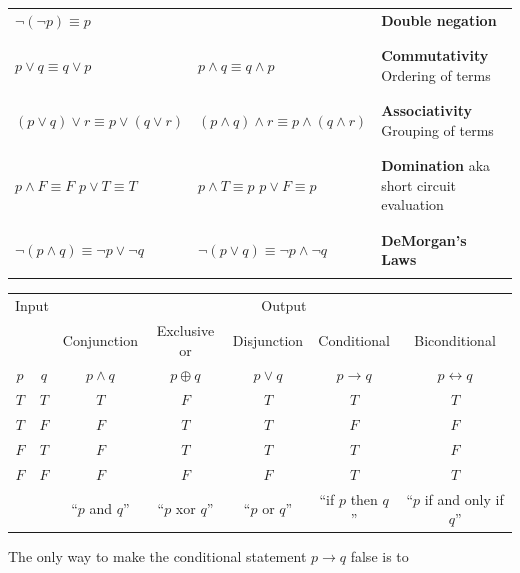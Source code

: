 \documentclass[12pt, oneside]{article}
\begin{document}
\begin{tabular}{llp{3in}}
$\lnot ( \lnot p) \equiv p$ & & {\bf Double negation}\\
&& \\
&& \\
$p \lor q \equiv q \lor p$ & $p \land q \equiv q \land p$ & {\bf Commutativity} Ordering of terms\\
&& \\
&& \\
$(p \lor q) \lor r  \equiv p \lor (q \lor r)$ & $(p \land q) \land r  \equiv p \land (q \land r)$ & {\bf Associativity} Grouping of terms\\
&& \\
&& \\
$p \land F \equiv F$ \qquad $p \lor T \equiv T$ & $p \land T \equiv p$ \qquad $p \lor F \equiv p$ & {\bf Domination} aka 
short circuit evaluation\\
&& \\
&& \\
$\lnot (p \land q) \equiv \lnot p \lor \lnot q$ & $\lnot (p \lor q) \equiv \lnot p \land\lnot q$  & {\bf DeMorgan's Laws}\\
&& \\
\end{tabular}
 \newpage


\begin{center}
    \begin{tabular}{cc||c|c|c|c|c}
    \multicolumn{2}{c||}{Input}  & \multicolumn{5}{c}{Output} \\
     & & Conjunction &  Exclusive or & Disjunction  &  Conditional & Biconditional  \\
    $p$ & $q$ & $p \wedge q$ &  $p  \oplus  q$ & $p \vee  q$ & $p \to q$ & $p \leftrightarrow q$\\
    \hline
    $T$ & $T$ & $T$ & $F$ & $T$ & $T$& $T$\\
    $T$ & $F$ & $F$ & $T$ & $T$ & $F$& $F$\\
    $F$ & $T$ & $F$ & $T$ & $T$ & $T$& $F$\\
    $F$ & $F$ & $F$ & $F$ & $F$ & $T$& $T$\\
    \hline
    && ``$p$ and $q$'' & ``$p$ xor $q$'' & ``$p$ or $q$'' & ``if $p$ then $q$'' & ``$p$ if and only if $q$''
    \end{tabular}
\end{center}
     

The only way to make  the conditional statement $p \to q$ false is to \underline{\phantom{\hspace{3in}}}\\
\end{document}
